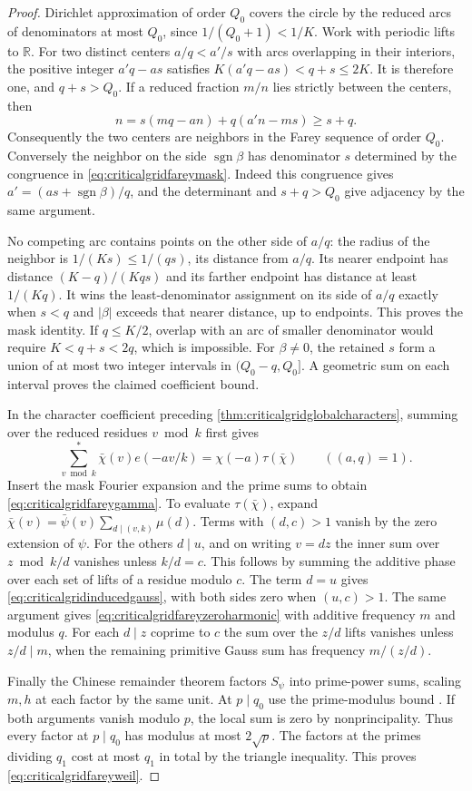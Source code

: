 \documentclass[11pt,a4paper]{article}
\numberwithin{equation}{section}
\begin{document}
\begin{proof}
Dirichlet approximation of order $Q_0$ covers the circle
by the reduced arcs of denominators at most $Q_0$, since
$1/(Q_0+1)<1/K$. Work with periodic lifts to $\mathbb R$.
For two distinct centers $a/q<a'/s$ with arcs overlapping in
their interiors, the positive integer $a'q-as$ satisfies
$K(a'q-as)<q+s\le2K$. It is therefore one, and $q+s>Q_0$.
If a reduced fraction $m/n$ lies strictly between the centers,
then
\[
 n=s(mq-an)+q(a'n-ms)\ge s+q .
\]
Consequently the two centers are neighbors in the Farey
sequence of order $Q_0$. Conversely the neighbor on the
side $\operatorname{sgn}\beta$ has denominator $s$ determined
by the congruence in \cref{eq:criticalgridfareymask}.
Indeed this congruence gives $a'=(as+\operatorname{sgn}\beta)/q$,
and the determinant and $s+q>Q_0$ give adjacency by
the same argument.

No competing arc contains points on the other side of $a/q$:
the radius of the neighbor is $1/(Ks)\le1/(qs)$, its
distance from $a/q$. Its nearer endpoint has distance
$(K-q)/(Kqs)$ and its farther endpoint has distance at least
$1/(Kq)$. It wins the least-denominator assignment on its side
of $a/q$ exactly when $s<q$ and $|\beta|$ exceeds that nearer
distance, up to endpoints. This proves the mask identity.
If $q\le K/2$, overlap with an arc of smaller denominator
would require $K<q+s<2q$, which is impossible.
For $\beta\ne0$, the retained $s$ form a union of at most two
integer intervals in $(Q_0-q,Q_0]$. A geometric sum on each
interval proves the claimed coefficient bound.

In the character coefficient preceding
\cref{thm:criticalgridglobalcharacters}, summing over the
reduced residues $v\bmod k$ first gives
\[
 \sum_{v\bmod k}^{*}\bar\chi(v)e(-av/k)
                  =\chi(-a)\tau(\bar\chi)
 \qquad ((a,q)=1).
\]
Insert the mask Fourier expansion and the prime sums to obtain
\cref{eq:criticalgridfareygamma}. To evaluate $\tau(\bar\chi)$,
expand $\bar\chi(v)=\bar\psi(v)\sum_{d\mid(v,k)}\mu(d)$.
Terms with $(d,c)>1$ vanish by the zero extension of $\psi$.
For the others $d\mid u$, and on writing $v=dz$ the inner sum
over $z\bmod k/d$ vanishes unless $k/d=c$. This follows by
summing the additive phase over each set of lifts of a residue
modulo $c$. The term $d=u$ gives \cref{eq:criticalgridinducedgauss},
with both sides zero when $(u,c)>1$.
The same argument gives \cref{eq:criticalgridfareyzeroharmonic}
with additive frequency $m$ and modulus $q$. For each $d\mid z$
coprime to $c$ the sum over the $z/d$ lifts vanishes unless
$z/d\mid m$, when the remaining primitive Gauss sum has
frequency $m/(z/d)$.

Finally the Chinese remainder theorem factors $S_\psi$ into
prime-power sums, scaling $m,h$ at each factor by the same unit.
At $p\mid q_0$ use the prime-modulus bound
\cite[Proposition~9.4]{KnightlyLiKuznetsov}. If both arguments
vanish modulo $p$, the local sum is zero by nonprincipality.
Thus every factor at $p\mid q_0$ has modulus at most $2\sqrt p$.
The factors at the primes dividing $q_1$ cost at most $q_1$
in total by the triangle inequality. This proves
\cref{eq:criticalgridfareyweil}.
\end{proof}
\end{document}
